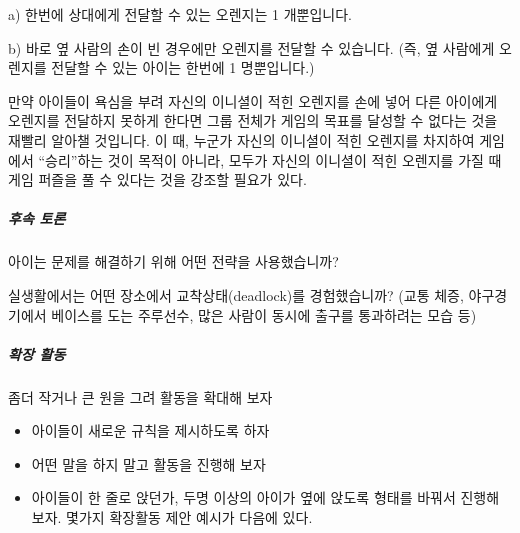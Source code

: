 \documentclass[]{article}
\begin{document}
a) 한번에 상대에게 전달할 수 있는 오렌지는 1 개뿐입니다.

b) 바로 옆 사람의 손이 빈 경우에만 오렌지를 전달할 수 있습니다. (즉, 옆
사람에게 오렌지를 전달할 수 있는 아이는 한번에 1 명뿐입니다.)

만약 아이들이 욕심을 부려 자신의 이니셜이 적힌 오렌지를 손에 넣어 다른
아이에게 오렌지를 전달하지 못하게 한다면 그룹 전체가 게임의 목표를
달성할 수 없다는 것을 재빨리 알아챌 것입니다. 이 때, 누군가 자신의
이니셜이 적힌 오렌지를 차지하여 게임에서 ``승리''하는 것이 목적이
아니라, 모두가 자신의 이니셜이 적힌 오렌지를 가질 때 게임 퍼즐을 풀 수
있다는 것을 강조할 필요가 있다.

\subparagraph{후속 토론}\label{section-140}

아이는 문제를 해결하기 위해 어떤 전략을 사용했습니까?

실생활에서는 어떤 장소에서 교착상태(deadlock)를 경험했습니까? (교통
체증, 야구경기에서 베이스를 도는 주루선수, 많은 사람이 동시에 출구를
통과하려는 모습 등)

\subparagraph{확장 활동}\label{section-141}

좀더 작거나 큰 원을 그려 활동을 확대해 보자

\begin{itemize}
\itemsep1pt\parskip0pt
\item
  아이들이 새로운 규칙을 제시하도록 하자
\item
  어떤 말을 하지 말고 활동을 진행해 보자
\item
  아이들이 한 줄로 앉던가, 두명 이상의 아이가 옆에 앉도록 형태를 바꿔서
  진행해 보자. 몇가지 확장활동 제안 예시가 다음에 있다.
\end{itemize}
\end{document}
